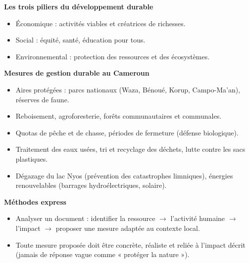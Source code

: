 \documentclass[11pt]{article}
\newcommand{\cle}[1]{{\popxbold\color{popdark}#1}}
\begin{document}
\begin{bilan}
\textbf{Les trois piliers du développement durable}
\begin{itemize}
  \item \cle{Économique} : activités viables et créatrices de richesses.
  \item \cle{Social} : équité, santé, éducation pour tous.
  \item \cle{Environnemental} : protection des ressources et des écosystèmes.
\end{itemize}

\textbf{Mesures de gestion durable au Cameroun}
\begin{itemize}
  \item Aires protégées : parcs nationaux (Waza, Bénoué, Korup, Campo-Ma'an), réserves de faune.
  \item Reboisement, agroforesterie, forêts communautaires et communales.
  \item Quotas de pêche et de chasse, périodes de fermeture (défense biologique).
  \item Traitement des eaux usées, tri et recyclage des déchets, lutte contre les sacs plastiques.
  \item Dégazage du lac Nyos (prévention des catastrophes limniques), énergies renouvelables (barrages hydroélectriques, solaire).
\end{itemize}

\textbf{Méthodes express}
\begin{itemize}
  \item Analyser un document : identifier la ressource $\rightarrow$ l'activité humaine $\rightarrow$ l'impact $\rightarrow$ proposer une mesure adaptée au contexte local.
  \item Toute mesure proposée doit être concrète, réaliste et reliée à l'impact décrit (jamais de réponse vague comme « protéger la nature »).
\end{itemize}
\end{bilan}
\end{document}
